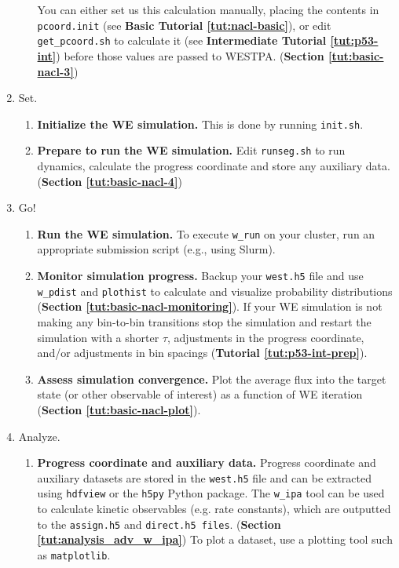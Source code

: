\begin{enumerate}
\begin{enumerate}
You can either set us this calculation manually, placing the contents in \verb|pcoord.init| (see \textbf{Basic Tutorial \ref{tut:nacl-basic}}), or edit \verb|get_pcoord.sh| to calculate it (see \textbf{Intermediate Tutorial \ref{tut:p53-int}}) before those values are passed to WESTPA. (\textbf{Section \ref{tut:basic-nacl-3}})
\end{enumerate}
\item Set.
\begin{enumerate}
\item \textbf{Initialize the WE simulation.}  This is done by running \verb|init.sh|.
\item \textbf{Prepare to run the WE simulation.} Edit \verb|runseg.sh| to run dynamics, calculate the progress coordinate and store any auxiliary data. (\textbf{Section \ref{tut:basic-nacl-4}})
\end{enumerate}
\item Go!
\begin{enumerate}
\item \textbf{Run the WE simulation.} 
To execute \verb|w_run| on your cluster, run an appropriate submission script (e.g., using Slurm).
\item \textbf{Monitor simulation progress.}
Backup your \verb|west.h5| file and use \verb|w_pdist| and \verb|plothist| to calculate and visualize probability distributions (\textbf{Section \ref{tut:basic-nacl-monitoring}}). 
If your WE simulation is not making any bin-to-bin transitions stop the simulation and restart the simulation with a shorter $\tau$, adjustments in the progress coordinate, and/or adjustments in bin spacings (\textbf{Tutorial \ref{tut:p53-int-prep}}). 
\item \textbf{Assess simulation convergence.} 
Plot the average flux into the target state (or other observable of interest) as a function of WE iteration (\textbf{Section \ref{tut:basic-nacl-plot}}).
\end{enumerate}
\item Analyze.
\begin{enumerate}
\item \textbf{Progress coordinate and auxiliary data.} 
Progress coordinate and auxiliary datasets are stored in the \verb|west.h5| file and can be extracted using \verb|hdfview| or the \verb|h5py| Python package. 
The \verb|w_ipa| tool can be used to calculate kinetic observables (e.g. rate constants), which are outputted to the \verb|assign.h5| and \verb|direct.h5 files|. (\textbf{Section \ref{tut:analysis_adv_w_ipa}}) 
To plot a dataset, use a plotting tool such as \verb|matplotlib|.

\end{enumerate}
\end{enumerate}

